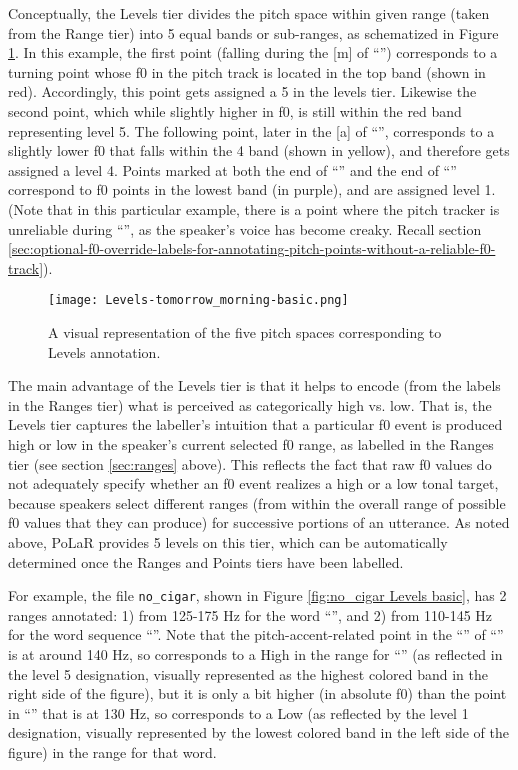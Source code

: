 Conceptually, the Levels tier divides the pitch space within given range (taken from the Range tier) into 5 equal bands or sub-ranges, as schematized in Figure \ref{fig:tomorrow_morning Levels basic}. In this example, the first point (falling during the [m] of “”) corresponds to a turning point whose f0 in the pitch track is located in the top band (shown in red). Accordingly, this point gets assigned a 5 in the levels tier. Likewise the second point, which while slightly higher in f0, is still within the red band representing level 5. The following point, later in the [a] of “”, corresponds to a slightly lower f0 that falls within the 4 band (shown in yellow), and therefore gets assigned a level 4. Points marked at both the end of “” and the end of “” correspond to f0 points in the lowest band (in purple), and are assigned level 1. (Note that in this particular example, there is a point where the pitch tracker is unreliable during “”, as the speaker’s voice has become creaky. Recall section \ref{sec:optional-f0-override-labels-for-annotating-pitch-points-without-a-reliable-f0-track}).

\begin{figure}[H]
\centering
%
\texttt{[image: Levels-tomorrow\_morning-basic.png]}
%
\caption{A visual representation of the five pitch spaces corresponding to Levels annotation.%
\label{fig:tomorrow_morning Levels basic}%
%
}
\end{figure}

The main advantage of the Levels tier is that it helps to encode (from the labels in the Ranges tier) what is perceived as categorically high vs. low. That is, the Levels tier captures the labeller’s intuition that a particular f0 event is produced high or low in the speaker’s current selected f0 range, as labelled in the Ranges tier (see section \ref{sec:ranges} above). This reflects the fact that raw f0 values do not adequately specify whether an f0 event realizes a high or a low tonal target, because speakers select different ranges (from within the overall range of possible f0 values that they can produce) for successive portions of an utterance. As noted above, PoLaR provides 5 levels on this tier, which can be automatically determined once the Ranges and Points tiers have been labelled.

For example, the file \texttt{no\_cigar}, shown in Figure \ref{fig:no_cigar Levels basic}, has 2 ranges annotated: 1) from 125-175 Hz for the word “”, and 2) from 110-145 Hz for the word sequence “”. Note that the pitch-accent-related point in the “” of “” is at around 140 Hz, so corresponds to a High in the range for “” (as reflected in the level 5 designation, visually represented as the highest colored band in the right side of the figure), but it is only a bit higher (in absolute f0) than the point in “” that is at 130 Hz, so corresponds to a Low (as reflected by the level 1 designation, visually represented by the lowest colored band in the left side of the figure) in the range for that word.

